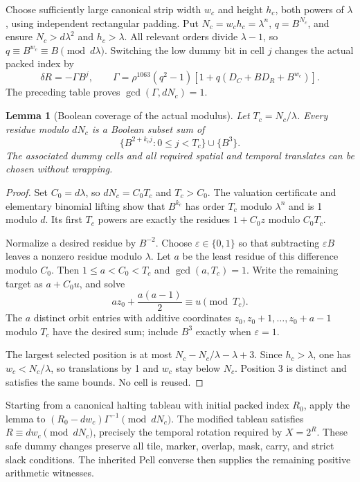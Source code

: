 \documentclass[11pt]{article}
\newtheorem{lemma}[theorem]{Lemma}
\begin{document}
Choose sufficiently large canonical strip width $w_c$ and height $h_c$,
both powers of $\lambda$, using independent rectangular padding. Put
$N_c=w_ch_c=\lambda^n$, $q=B^{N_c}$, and ensure
$N_c>d\lambda^2$ and $h_c>\lambda$. All relevant orders divide
$\lambda-1$, so $q\equiv B^{w_c}\equiv B\pmod{d\lambda}$.
Switching the low dummy bit in cell $j$ changes the actual packed index by
\[
 \delta R=-\Gamma B^j,\qquad
 \Gamma=\rho^{1063}(q^2-1)
             [1+q(D_C+BD_R+B^{w_c})].
\]
The preceding table proves $\gcd(\Gamma,dN_c)=1$.

\begin{lemma}[Boolean coverage of the actual modulus]
Let $T_c=N_c/\lambda$. Every residue modulo $dN_c$ is a Boolean subset sum
of
\[
 \{B^{2+k_cj}:0\le j<T_c\}\cup\{B^3\}.
\]
The associated dummy cells and all required spatial and temporal translates
can be chosen without wrapping.
\end{lemma}
\begin{proof}
Set $C_0=d\lambda$, so $dN_c=C_0T_c$ and $T_c>C_0$.
The valuation certificate and elementary binomial lifting show that $B^{k_c}$
has order $T_c$ modulo $\lambda^n$ and is 1 modulo $d$. Its first $T_c$
powers are exactly the residues $1+C_0z$ modulo $C_0T_c$.

Normalize a desired residue by $B^{-2}$. Choose $\varepsilon\in\{0,1\}$
so that subtracting $\varepsilon B$ leaves a nonzero residue modulo
$\lambda$. Let $a$ be the least residue of this difference modulo $C_0$.
Then $1\le a<C_0<T_c$ and $\gcd(a,T_c)=1$. Write the remaining target as
$a+C_0u$, and solve
\[
 az_0+\frac{a(a-1)}2\equiv u\pmod{T_c}.
\]
The $a$ distinct orbit entries with additive coordinates
$z_0,z_0+1,\ldots,z_0+a-1$ modulo $T_c$ have the desired sum; include
$B^3$ exactly when $\varepsilon=1$.

The largest selected position is at most
$N_c-N_c/\lambda-\lambda+3$. Since $h_c>\lambda$, one has
$w_c<N_c/\lambda$, so translations by 1 and $w_c$ stay below $N_c$.
Position 3 is distinct and satisfies the same bounds. No cell is reused.
\end{proof}

Starting from a canonical halting tableau with initial packed index $R_0$,
apply the lemma to $(R_0-dw_c)\Gamma^{-1}\pmod{dN_c}$. The modified
tableau satisfies $R\equiv dw_c\pmod{dN_c}$, precisely the temporal
rotation required by $X=2^R$. These safe dummy changes preserve all tile,
marker, overlap, mask, carry, and strict slack conditions. The inherited
Pell converse then supplies the remaining positive arithmetic witnesses.
\end{document}

